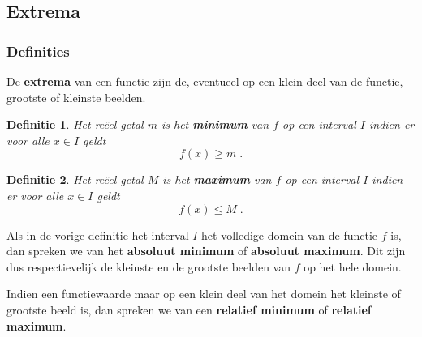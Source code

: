 \documentclass[12pt,a4paper,twoside]{article}
\newtheorem{definition}{Definitie}
\begin{document}
\begin{oefening}
\begin{enumerate}[(a)]
\begin{center}
    \end{center}
\end{enumerate}
\end{oefening}

\subsection{Extrema}

\subsubsection*{Definities}

De {\bf extrema} van een functie zijn de, eventueel op een klein deel van de functie, grootste of kleinste beelden.

\begin{definition}
  Het reëel getal $m$ is het {\bf minimum} van $f$ op een interval $I$ indien er voor alle $x\in I$ geldt
  $$f(x)\geq m\;.$$
\end{definition}

\begin{definition}
  Het reëel getal $M$ is het {\bf maximum} van $f$ op een interval $I$ indien er voor alle $x\in I$ geldt
  $$f(x)\leq M\;.$$
\end{definition}

Als in de vorige definitie het interval $I$ het volledige domein van de functie $f$ is, dan spreken we van het {\bf absoluut minimum} of {\bf absoluut maximum}. Dit zijn dus respectievelijk de kleinste en de grootste beelden van $f$ op het hele domein.

Indien een functiewaarde maar op een klein deel van het domein het kleinste of grootste beeld is, dan spreken we van een {\bf relatief minimum} of {\bf relatief maximum}.
\end{document}
